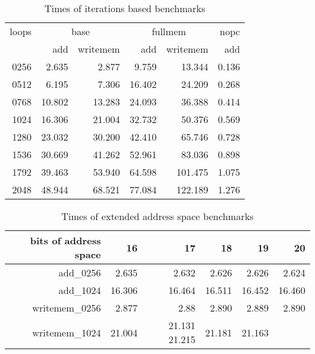 \begin{table}
    \centering
    \begin{tabular}{r|rr|rr|r}
        loops & \multicolumn{2}{c|}{base} & \multicolumn{2}{c|}{fullmem} & nopc                      \\
              & add                       & writemem                     & add    & writemem & add   \\ \hline
        0256  & 2.635                     & 2.877                        & 9.759  & 13.344   & 0.136 \\
        0512  & 6.195                     & 7.306                        & 16.402 & 24.209   & 0.268 \\
        0768  & 10.802                    & 13.283                       & 24.093 & 36.388   & 0.414 \\
        1024  & 16.306                    & 21.004                       & 32.732 & 50.376   & 0.569 \\
        1280  & 23.032                    & 30.200                       & 42.410 & 65.746   & 0.728 \\
        1536  & 30.669                    & 41.262                       & 52.961 & 83.036   & 0.898 \\
        1792  & 39.463                    & 53.940                       & 64.598 & 101.475  & 1.075 \\
        2048  & 48.944                    & 68.521                       & 77.084 & 122.189  & 1.276 \\
    \end{tabular}
    \caption{Times of iterations based benchmarks}\label{tab:time_iter}
\end{table}

\begin{table}
    \centering
    \begin{tabular}{r|rrrrr}
        bits of address space & 16     & 17            & 18     & 19     & 20     \\\hline
        add\_0256             & 2.635  & 2.632         & 2.626  & 2.626  & 2.624  \\
        add\_1024             & 16.306 & 16.464        & 16.511 & 16.452 & 16.460 \\

        writemem\_0256        & 2.877  & 2.88          & 2.890  & 2.889  & 2.890  \\
        writemem\_1024        & 21.004 & 21.131 21.215 & 21.181 & 21.163          \\

    \end{tabular}
    \caption{Times of extended address space benchmarks}\label{tab:time_extaddr}
\end{table}
